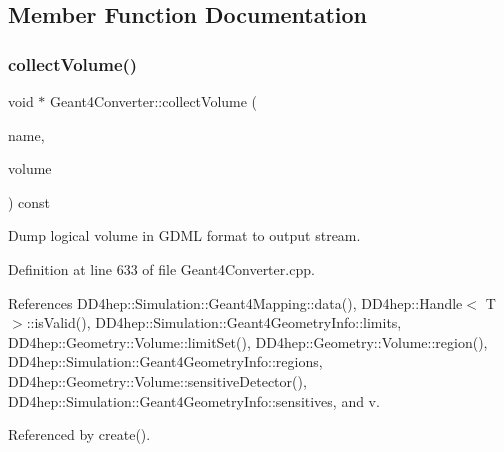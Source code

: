 \subsection{Member Function Documentation}
\hypertarget{class_d_d4hep_1_1_simulation_1_1_geant4_converter_af8ec25c8b47eaf4fcc2ccdad9d7fb17f}{}\label{class_d_d4hep_1_1_simulation_1_1_geant4_converter_af8ec25c8b47eaf4fcc2ccdad9d7fb17f} 
\subsubsection{\texorpdfstring{collect\+Volume()}{collectVolume()}}
{\footnotesize\ttfamily void $\ast$ Geant4\+Converter\+::collect\+Volume (\begin{DoxyParamCaption}\item[{const std\+::string \&}]{name,  }\item[{const T\+Geo\+Volume $\ast$}]{volume }\end{DoxyParamCaption}) const\hspace{0.3cm}{\ttfamily [virtual]}}



Dump logical volume in G\+D\+ML format to output stream. 



Definition at line 633 of file Geant4\+Converter.\+cpp.



References D\+D4hep\+::\+Simulation\+::\+Geant4\+Mapping\+::data(), D\+D4hep\+::\+Handle$<$ T $>$\+::is\+Valid(), D\+D4hep\+::\+Simulation\+::\+Geant4\+Geometry\+Info\+::limits, D\+D4hep\+::\+Geometry\+::\+Volume\+::limit\+Set(), D\+D4hep\+::\+Geometry\+::\+Volume\+::region(), D\+D4hep\+::\+Simulation\+::\+Geant4\+Geometry\+Info\+::regions, D\+D4hep\+::\+Geometry\+::\+Volume\+::sensitive\+Detector(), D\+D4hep\+::\+Simulation\+::\+Geant4\+Geometry\+Info\+::sensitives, and v.



Referenced by create().

\hypertarget{class_d_d4hep_1_1_simulation_1_1_geant4_converter_ab43bb402a64c6647e47f4706097f8990}{}\label{class_d_d4hep_1_1_simulation_1_1_geant4_converter_ab43bb402a64c6647e47f4706097f8990} 
